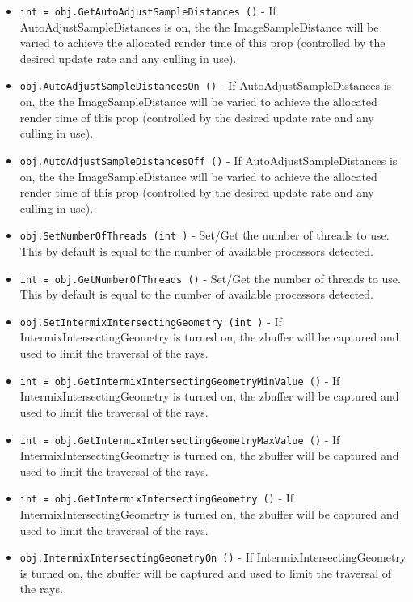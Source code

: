 \begin{itemize}
\item  \verb|int = obj.GetAutoAdjustSampleDistances ()| -  If AutoAdjustSampleDistances is on, the the ImageSampleDistance
 will be varied to achieve the allocated render time of this 
 prop (controlled by the desired update rate and any culling in
 use). 

\item  \verb|obj.AutoAdjustSampleDistancesOn ()| -  If AutoAdjustSampleDistances is on, the the ImageSampleDistance
 will be varied to achieve the allocated render time of this 
 prop (controlled by the desired update rate and any culling in
 use). 

\item  \verb|obj.AutoAdjustSampleDistancesOff ()| -  If AutoAdjustSampleDistances is on, the the ImageSampleDistance
 will be varied to achieve the allocated render time of this 
 prop (controlled by the desired update rate and any culling in
 use). 

\item  \verb|obj.SetNumberOfThreads (int )| -  Set/Get the number of threads to use. This by default is equal to
 the number of available processors detected.

\item  \verb|int = obj.GetNumberOfThreads ()| -  Set/Get the number of threads to use. This by default is equal to
 the number of available processors detected.

\item  \verb|obj.SetIntermixIntersectingGeometry (int )| -  If IntermixIntersectingGeometry is turned on, the zbuffer will be
 captured and used to limit the traversal of the rays.

\item  \verb|int = obj.GetIntermixIntersectingGeometryMinValue ()| -  If IntermixIntersectingGeometry is turned on, the zbuffer will be
 captured and used to limit the traversal of the rays.

\item  \verb|int = obj.GetIntermixIntersectingGeometryMaxValue ()| -  If IntermixIntersectingGeometry is turned on, the zbuffer will be
 captured and used to limit the traversal of the rays.

\item  \verb|int = obj.GetIntermixIntersectingGeometry ()| -  If IntermixIntersectingGeometry is turned on, the zbuffer will be
 captured and used to limit the traversal of the rays.

\item  \verb|obj.IntermixIntersectingGeometryOn ()| -  If IntermixIntersectingGeometry is turned on, the zbuffer will be
 captured and used to limit the traversal of the rays.


\end{itemize}
